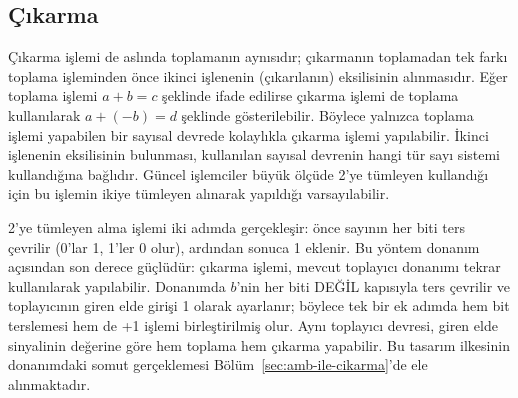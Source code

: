 \subsection{Çıkarma}

Çıkarma işlemi de aslında toplamanın aynısıdır; çıkarmanın toplamadan tek farkı toplama işleminden önce ikinci işlenenin (çıkarılanın) eksilisinin alınmasıdır. Eğer toplama işlemi $a + b = c$ şeklinde ifade edilirse çıkarma işlemi de toplama kullanılarak $a + (-b) = d$ şeklinde gösterilebilir. Böylece yalnızca toplama işlemi yapabilen bir sayısal devrede kolaylıkla çıkarma işlemi yapılabilir. İkinci işlenenin eksilisinin bulunması, kullanılan sayısal devrenin hangi tür sayı sistemi kullandığına bağlıdır. Güncel işlemciler büyük ölçüde 2'ye tümleyen kullandığı için bu işlemin ikiye tümleyen alınarak yapıldığı varsayılabilir.

2'ye tümleyen alma işlemi iki adımda gerçekleşir: önce sayının her biti ters çevrilir (0'lar 1, 1'ler 0 olur), ardından sonuca 1 eklenir. Bu yöntem donanım açısından son derece güçlüdür: çıkarma işlemi, mevcut toplayıcı donanımı tekrar kullanılarak yapılabilir. Donanımda $b$'nin her biti DEĞİL kapısıyla ters çevrilir ve toplayıcının giren elde girişi 1 olarak ayarlanır; böylece tek bir ek adımda hem bit terslemesi hem de +1 işlemi birleştirilmiş olur. Aynı toplayıcı devresi, giren elde sinyalinin değerine göre hem toplama hem çıkarma yapabilir. Bu tasarım ilkesinin donanımdaki somut gerçeklemesi Bölüm~\ref{sec:amb-ile-cikarma}'de ele alınmaktadır.

